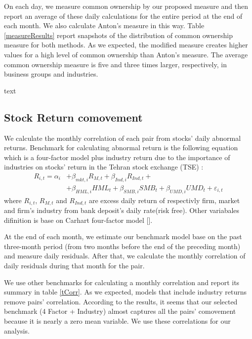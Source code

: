 On each day, we measure common ownership by our proposed measure and then report an average of these daily calculations for the entire period at the end of each month. We also calculate Anton's measure in this way. Table \ref{measureResults} report snapshots of the distribution of common ownership measure for both methods. As we expected, the modified measure creates higher values for a high level of common ownership than Anton's measure. The average common ownership measure is five and three times larger, respectively, in business groups and industries.
		\begin{table}[htbp]
			\caption{ text}
			\label{measureResults}
			\resizebox{1\textwidth}{!}
			{
					{}
			}
		\end{table}
\FloatBarrier
\subsection{{Stock Return comovement}}
\label{comovement}

	We calculate the monthly correlation of each pair from stocks' daily abnormal returns. Benchmark for calculating abnormal return is the following equation which is a four-factor model plus industry return due to the importance of industries on stocks' return in the Tehran stock exchange (TSE) :
	\begin{equation}
		\begin{split}
			R_{i,t} =\alpha _{i}&+\beta _{mkt,i}{\mathit {R}}_{M,t} + \beta_{Ind,i}{\mathit {R}}_{Ind,t} + \\
			&+\beta _{HML,i}{\mathit {HML}}_{t}+\beta _{SMB,i}{\mathit {SMB}}_{t}+\beta _{UMD,i}{\mathit {UMD}}_{t}+ \varepsilon_{i,t}
		\end{split}
		\label{e5Factor}
	\end{equation}
	where $ R_{i,t} $, $ R_{M,t} $ and $ R_{Ind,t} $ are excess daily return of respectivly  firm, market and firm's industry from bank deposit's daily rate(risk free). Other variabales difinition is base on Carhart four-factor model [\cite{Carhart4Factor}].
	
	At the end of each month, we estimate our benchmark model base on the past three-month period (from two months before the end of the preceding month) and measure daily residuals.  After that, we calculate the monthly correlation of daily residuals during that month for the pair.
	
	We use other benchmarks for calculating a monthly correlation and report its summary in table \ref{tCorr}. 
	As we expected,  models that include industry returns remove pairs' correlation. According to the results, it seems that our selected benchmark (4 Factor + Industry) almost captures all the pairs' comovement because it is nearly a zero mean variable. We use these correlations for our analysis.
	
